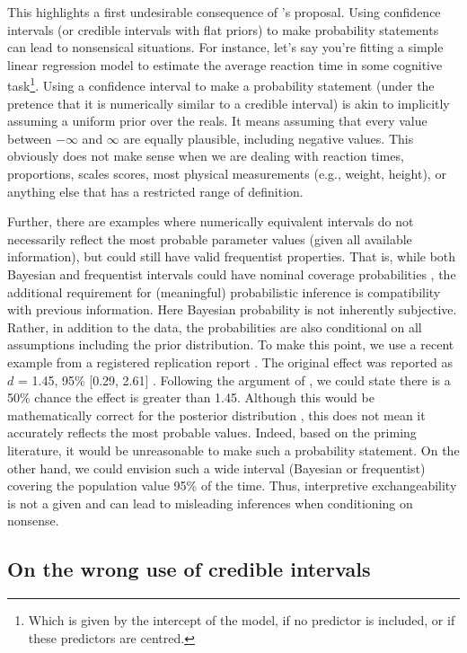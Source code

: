 \documentclass[a4paper,man,natbib,floatsintext,donotrepeattitle]{apa6}
\begin{document}
 This highlights a first undesirable consequence of \cite{albers_credible_2018}'s proposal. Using confidence intervals (or credible intervals with flat priors) to make probability statements can lead to nonsensical situations. For instance, let's say you're fitting a simple linear regression model to estimate the average reaction time in some cognitive task\footnote{Which is given by the intercept of the model, if no predictor is included, or if these predictors are centred.}. Using a confidence interval to make a probability statement (under the pretence that it is numerically similar to a credible interval) is akin to implicitly assuming a uniform prior over the reals. It means assuming that every value between $-\infty$ and $\infty$ are equally plausible, including negative values. This obviously does not make sense when we are dealing with reaction times, proportions, scales scores, most physical measurements (e.g., weight, height), or anything else that has a restricted range of definition.
 
 Further, there are examples where numerically equivalent intervals do not necessarily reflect the most probable parameter values (given all available information), but could still have valid frequentist properties. That is, while both Bayesian and frequentist intervals could have nominal coverage probabilities \citep{albers_credible_2018}, the additional requirement for (meaningful) probabilistic inference is compatibility with previous information. Here Bayesian probability is not inherently subjective. Rather, in addition to the data, the probabilities are also conditional on all assumptions including the prior distribution. To make this point, we use a recent example from a registered replication report \citep{verschuere_registered_2018}. The original effect was reported as $d$ = 1.45, 95\% [0.29, 2.61] \citep{mazar_dishonesty_2008}. Following the argument of \cite{albers_credible_2018}, we could state there is a 50\% chance the effect is greater than 1.45. Although this would be mathematically correct for the posterior distribution \citep{gelman_p_2013}, this does not mean it accurately reflects the most probable values. Indeed, based on the priming literature, it would be unreasonable to make such a probability statement. On the other hand, we could envision such a wide interval (Bayesian or frequentist) covering the population value 95\% of the time. Thus, interpretive exchangeability is not a given and can lead to misleading inferences when conditioning on nonsense.

\subsection{On the wrong use of credible intervals}
\end{document}

